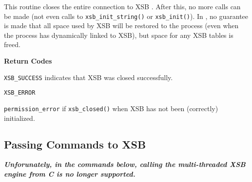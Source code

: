 \begin{description}
%
This routine closes the entire connection to XSB .  After this, no
more calls can be made (not even calls to {\tt xsb\_init\_string()} or
{\tt xsb\_init()}).  In \version{}, no guarantee is made that all
space used by XSB will be restored to the process (even when the
process has dynamically linked to XSB), but space for any XSB tables
is freed.

{\bf Return Codes} 
\bi
\item {\tt XSB\_SUCCESS} indicates that XSB was closed successfully.
%
\item {\tt XSB\_ERROR} 
\bi
\item {\tt permission\_error} if {\tt xsb\_closed()} when XSB has not been
(correctly) initialized.  
\ei
%
\ei

\end{description}

\subsection{Passing Commands to XSB}
           {\bf {\em Unforunately, in the commands below, calling the multi-threaded XSB engine from C is no longer supported.}}
             
